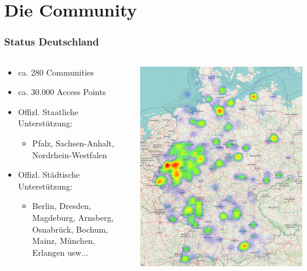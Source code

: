 \section{Die Community}

\begin{frame}
\frametitle{Status Deutschland}
	\begin{columns}[c]   
		\begin{column}[T]{0.6\textwidth}     
			\begin{itemize}
				\item ca. 280 Communities \footnotemark[1]
				\item ca. 30.000 Access Points \footnotemark[1]
				\item Offizl. Staatliche Unterstützung:
				\begin{itemize}
					\item Pfalz, Sachsen-Anhalt, Nordrhein-Westfalen 
				\end{itemize}
				\item Offizl. Städtische Unterstützung:
				\begin{itemize}
					\item Berlin, Dresden, Magdeburg, Arnsberg, Osnabrück, Bochum, Mainz, München, Erlangen usw...
				\end{itemize}
			\end{itemize}
		\end{column}
		\begin{column}[T]{0.4\textwidth}     
			\includegraphics[width=\textwidth]{images/heatmap_germany.png} 
		\end{column}
	\end{columns}		

\end{frame}

